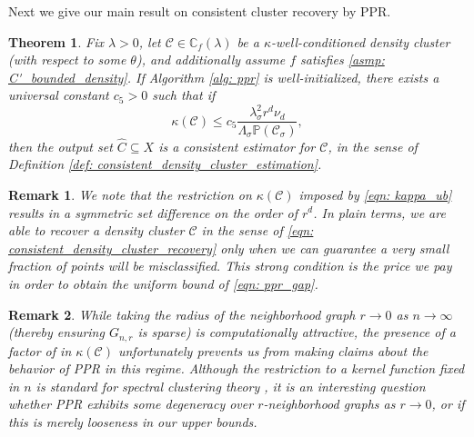 \documentclass{article}
\newcommand{\1}{\mathbf{1}}
\newcommand{\Xbf}{X}             %
\newcommand{\Pbb}{\mathbb{P}}
\newcommand{\Cbb}{\mathbb{C}}
\newcommand{\Cset}{\mathcal{C}}
\newcommand{\Csig}{\Cset_{\sigma}}
\newcommand{\Cest}{\widehat{C}}
\theoremstyle{aldenthm}
\newtheorem{theorem}{Theorem}
\theoremstyle{aldenrmrk}
\newtheorem{remark}{Remark}
\begin{document}
Next we give our main result on consistent cluster recovery by PPR.

\begin{theorem}
  \label{thm: consistent_recovery_of_density_clusters}
  Fix $\lambda > 0$, let $\Cset \in \Cbb_f(\lambda)$ be a
  $\kappa$-well-conditioned density cluster (with respect to some $\theta$), and
  additionally assume $f$ satisfies \ref{asmp: C'_bounded_density}. If Algorithm
  \ref{alg: ppr} is well-initialized, there exists a universal constant $c_5 >
  0$ such that if 
  \begin{equation}
    \label{eqn: kappa_ub}
    \kappa(\Cset) \leq c_5 \frac{\lambda_{\sigma}^2r^d
      \nu_d}{\Lambda_{\sigma}\Pbb(\Csig)}, 
  \end{equation}
  then the output set $\Cest \subseteq \Xbf$ is a consistent estimator for
  $\Cset$, in the sense of Definition \ref{def: consistent_density_cluster_estimation}. 
\end{theorem}

\begin{remark}
  We note that the restriction on $\kappa(\Cset)$ imposed by \eqref{eqn:
    kappa_ub} results in a symmetric set difference \smash{$\Delta(\Csig[\Xbf],
    \Cest)$} on the order of $r^d$. In plain terms, we are able to recover a
  density cluster $\Cset$ in the sense of \eqref{eqn:
    consistent_density_cluster_recovery} only when we can guarantee a very small
  fraction of points will be misclassified. This strong condition is the price
  we pay in order to obtain the uniform bound of \eqref{eqn: ppr_gap}. 
\end{remark}

\begin{remark}
  While taking the radius of the neighborhood graph $r \to 0$ as $n \to
  \infty$ (thereby ensuring $G_{n,r}$ is sparse) is computationally
  attractive, the presence of a factor of  in
  $\kappa(\Cset)$ unfortunately prevents us from making claims about the
  behavior of PPR in this regime. Although the restriction to a kernel
  function fixed in $n$ is standard for spectral clustering theory
  \citep{schiebinger2015,vonluxburg2008}, it is an interesting question whether
  PPR exhibits some degeneracy over $r$-neighborhood graphs as $r \to 0$, or if
  this is merely looseness in our upper bounds.  
\end{remark}
\end{document}
